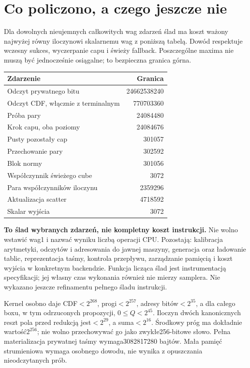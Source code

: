 \documentclass[11pt,a4paper]{article}
\begin{document}
\section{Co policzono, a czego jeszcze nie}
Dla dowolnych nieujemnych całkowitych wag zdarzeń ślad ma koszt ważony
najwyżej równy iloczynowi skalarnemu wag z poniższą tabelą. Dowód respektuje
wczesny sukces, wyczerpanie capu i świeży fallback. Poszczególne maxima
nie muszą być jednocześnie osiągalne; to bezpieczna granica górna.
\begin{center}\begin{tabular}{lr}\toprule
Zdarzenie & Granica\\\midrule
Odczyt prywatnego bitu &24662538240\\
Odczyt CDF, włącznie z terminalnym &770703360\\
Próba pary &24084480\\
Krok capu, oba poziomy &24084676\\
Pusty pozostały cap &301057\\
Przechowanie pary &302592\\
Blok normy &301056\\
Współczynnik świeżego cube &3072\\
Para współczynników iloczynu &2359296\\
Aktualizacja scatter &4718592\\
Skalar wyjścia &3072\\\bottomrule
\end{tabular}\end{center}
\textbf{To ślad wybranych zdarzeń, nie kompletny koszt instrukcji.}
Nie wolno wstawić wag1 i nazwać wyniku liczbą operacji CPU. Pozostają:
kalibracja arytmetyki, odczytów i adresowania do jawnej maszyny, generacja
oraz ładowanie tablic, reprezentacja taśmy, kontrola przepływu, zarządzanie
pamięcią i koszt wyjścia w konkretnym backendzie. Funkcja licząca ślad
jest instrumentacją specyfikacji; jej własny czas wykonania również nie
mierzy samplera. Nie wykazano jeszcze refinamentu pełnego śladu instrukcji.

Kernel osobno daje CDF$<2^{268}$, progi$<2^{257}$, adresy bitów$<2^{35}$,
a dla całego boxu, w tym odrzuconych propozycji, $0\le Q<2^{45}$.
Iloczyn dwóch kanonicznych reszt pola przed redukcją jest$<2^{29}$,
a suma$<2^{16}$. Środkowy próg ma dokładnie wartość$2^{256}$;
nie wolno przechowywać go jako zwykłe256-bitowe słowo. Pełna materializacja
prywatnej taśmy wymaga3082817280 bajtów. Mała pamięć strumieniowa wymaga
osobnego dowodu, nie wynika z opuszczania nieodczytanych prób.
\end{document}
